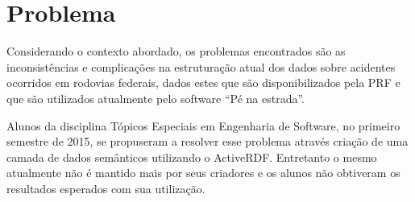 \section{Problema}

Considerando o contexto abordado, os problemas encontrados são as inconsistências e
complicações na estruturação atual dos dados sobre acidentes ocorridos em rodovias
federais, dados estes que são disponibilizados pela PRF e que são utilizados atualmente
pelo software “Pé na estrada”.

Alunos da disciplina Tópicos Especiais em Engenharia de Software, no primeiro semestre de 2015, se propuseram a resolver esse problema através criação de uma camada de dados semânticos utilizando o ActiveRDF. Entretanto o mesmo atualmente não é mantido mais por seus criadores e os alunos não obtiveram os resultados esperados com sua utilização. 
